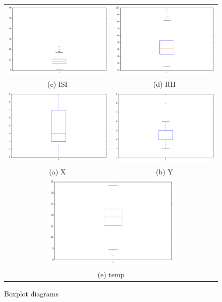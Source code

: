 \begin{figure}
\begin{tabular}{cc}
 \includegraphics[width=65mm]{images/boxplots/ISI.png} &   \includegraphics[width=65mm]{images/boxplots/RH.png} \\
(c) ISI & (d) RH \\[6pt]
  \includegraphics[width=65mm]{images/boxplots/x.png} &   \includegraphics[width=65mm]{images/boxplots/y.png} \\
(a) X & (b) Y \\[6pt]
\multicolumn{2}{c}{\includegraphics[width=65mm]{images/boxplots/temp.png} }\\
\multicolumn{2}{c}{(e) temp}
\end{tabular}
\caption{Boxplot diagrams}
\end{figure}